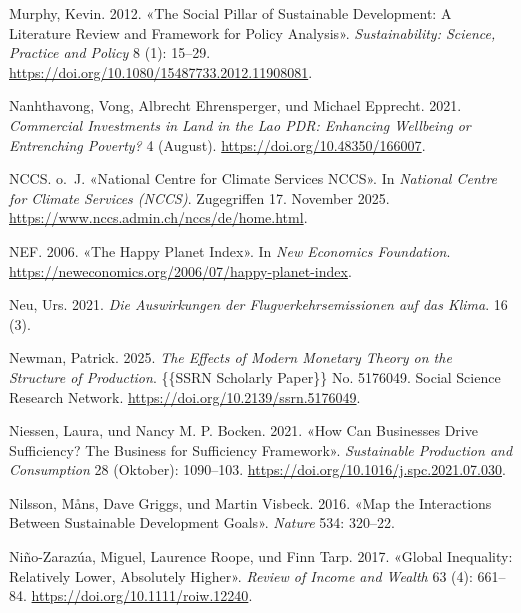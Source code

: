 \documentclass[
  nswissgerman,
  a4paper,
  DIV=11,
  numbers=noendperiod,
  oneside,
  openany]{scrreprt}
\newlength{\cslhangindent}
\newenvironment{CSLReferences}[2] %
 {\begin{list}{}{%
  \setlength{\itemindent}{0pt}
  \setlength{\leftmargin}{0pt}
  \setlength{\parsep}{0pt}
  \ifodd #1
   \setlength{\leftmargin}{\cslhangindent}
   \setlength{\itemindent}{-1\cslhangindent}
  \fi
  \setlength{\itemsep}{#2\baselineskip}}}
 {\end{list}}
\begin{document}
\begin{CSLReferences}{1}{1}
Murphy, Kevin. 2012. {«The Social Pillar of Sustainable Development: A
Literature Review and Framework for Policy Analysis»}.
\emph{Sustainability: Science, Practice and Policy} 8 (1): 15--29.
\url{https://doi.org/10.1080/15487733.2012.11908081}.

Nanhthavong, Vong, Albrecht Ehrensperger, und Michael Epprecht. 2021.
\emph{Commercial Investments in Land in the {Lao PDR}: {Enhancing}
Wellbeing or Entrenching Poverty?} 4 (August).
\url{https://doi.org/10.48350/166007}.

NCCS. o.~J. {«National {Centre} for {Climate} {Services} {NCCS}»}. In
\emph{National Centre for Climate Services (NCCS)}. Zugegriffen 17.
November 2025. \url{https://www.nccs.admin.ch/nccs/de/home.html}.

NEF. 2006. {«The {Happy} {Planet} {Index}»}. In \emph{New Economics
Foundation}. \url{https://neweconomics.org/2006/07/happy-planet-index}.

Neu, Urs. 2021. \emph{{Die Auswirkungen der Flugverkehrsemissionen auf
das Klima}}. 16 (3).

Newman, Patrick. 2025. \emph{The {Effects} of {Modern Monetary Theory}
on the {Structure} of {Production}}. \{\{SSRN Scholarly Paper\}\} No.
5176049. Social Science Research Network.
\url{https://doi.org/10.2139/ssrn.5176049}.

Niessen, Laura, und Nancy M. P. Bocken. 2021. {«How Can Businesses Drive
Sufficiency? {The} Business for Sufficiency Framework»}.
\emph{Sustainable Production and Consumption} 28 (Oktober): 1090--103.
\url{https://doi.org/10.1016/j.spc.2021.07.030}.

Nilsson, Måns, Dave Griggs, und Martin Visbeck. 2016. {«Map the
Interactions Between {Sustainable Development Goals}»}. \emph{Nature}
534: 320--22.

Niño-Zarazúa, Miguel, Laurence Roope, und Finn Tarp. 2017. {«Global
{Inequality}: {Relatively Lower}, {Absolutely Higher}»}. \emph{Review of
Income and Wealth} 63 (4): 661--84.
\url{https://doi.org/10.1111/roiw.12240}.


\end{CSLReferences}
\end{document}
